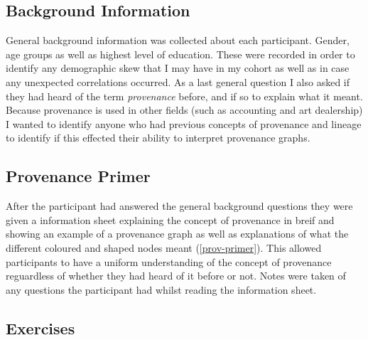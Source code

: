\subsection{Background Information}
\label{sec:background_information}

General background information was collected about each participant. Gender, age groups as well as highest level of education. These were recorded in order to identify any demographic skew that I may have in my cohort as well as in case any unexpected correlations occurred. As a last general question I also asked if they had heard of the term \textit{provenance} before, and if so to explain what it meant. Because provenance is used in other fields (such as accounting and art dealership) I wanted to identify anyone who had previous concepts of provenance and lineage to identify if this effected their ability to interpret provenance graphs.

\subsection{Provenance Primer}
\label{sec:provenance_primer}

After the participant had answered the general background questions they were given a information sheet explaining the concept of provenance in breif and showing an example of a provenance graph as well as explanations of what the different coloured and shaped nodes meant (\ref{prov-primer}). This allowed participants to have a uniform understanding of the concept of provenance reguardless of whether they had heard of it before or not. Notes were taken of any questions the participant had whilst reading the information sheet.

\subsection{Exercises}
\label{sec:exercises}

